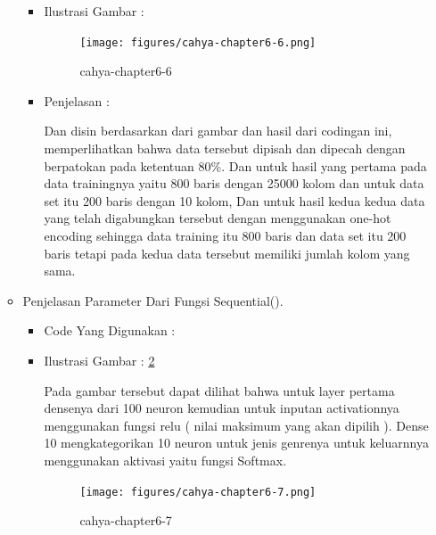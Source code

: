 \begin{enumerate}
\begin{itemize}
\begin{itemize}
\par
\item Ilustrasi Gambar :
\par
\begin{figure}[!hbtp]
\centering
\texttt{[image: figures/cahya-chapter6-6.png]}
\caption{cahya-chapter6-6}
\label{cahya-chapter6-6}
\end{figure}
\par
\item Penjelasan : 
\par Dan disin berdasarkan dari gambar dan hasil dari codingan ini, memperlihatkan bahwa data tersebut dipisah dan dipecah dengan berpatokan pada ketentuan 80\%. Dan untuk hasil yang pertama pada data trainingnya yaitu 800 baris dengan 25000 kolom dan untuk data set itu 200 baris dengan 10 kolom, Dan untuk hasil kedua kedua data yang telah digabungkan tersebut dengan menggunakan one-hot encoding sehingga data training itu 800 baris dan data set itu 200 baris tetapi pada kedua data tersebut memiliki jumlah kolom yang sama.
\par
\par
\end{itemize}
\par
\par
\par
\par
\item Penjelasan Parameter Dari Fungsi Sequential().
\begin{itemize}
\item Code Yang Digunakan :
\par

\par
\item Ilustrasi Gambar : \ref{cahya-chapter6-7}
\par Pada gambar tersebut dapat dilihat bahwa untuk layer pertama densenya dari 100 neuron kemudian untuk inputan activationnya menggunakan fungsi relu ( nilai maksimum yang akan dipilih ). Dense 10 mengkategorikan 10 neuron untuk jenis genrenya untuk keluarnnya menggunakan aktivasi yaitu fungsi Softmax.
\begin{figure}[!hbtp]
\centering
\texttt{[image: figures/cahya-chapter6-7.png]}
\caption{cahya-chapter6-7}
\label{cahya-chapter6-7}
\end{figure}
\par
\end{itemize}
\par
\par
\par

\end{itemize}
\end{enumerate}
